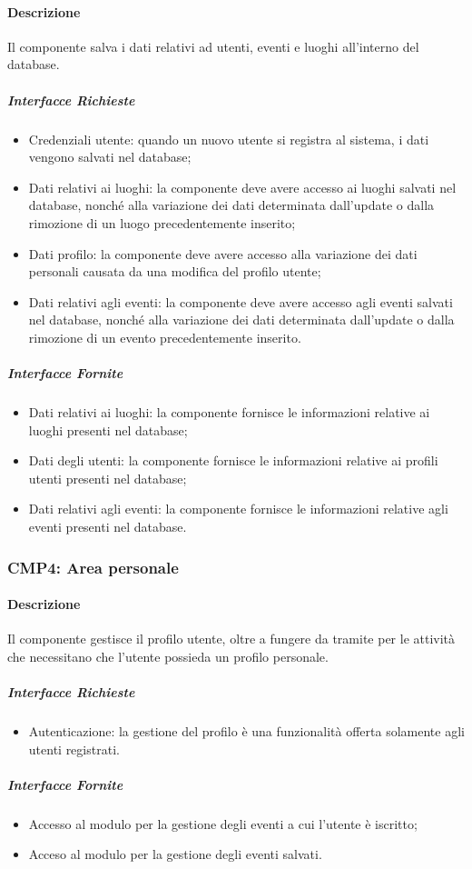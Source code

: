 \documentclass[9pt]{extarticle}
\begin{document}
\paragraph{Descrizione}
Il componente salva i dati relativi ad utenti, eventi e luoghi all'interno del database.
\subparagraph{Interfacce Richieste}
\begin{itemize}
	\item Credenziali utente: quando un nuovo utente si registra al sistema, i dati vengono salvati nel database;
	\item Dati relativi ai luoghi: la componente deve avere accesso ai luoghi salvati nel database, nonché alla variazione dei dati determinata dall'update o dalla rimozione di un luogo precedentemente inserito;
	\item Dati profilo: la componente deve avere accesso alla variazione dei dati personali causata da una modifica del profilo utente;
	\item Dati relativi agli eventi: la componente deve avere accesso agli eventi salvati nel database, nonché  alla variazione dei dati determinata dall'update o dalla rimozione di un evento precedentemente inserito.
\end{itemize}
\subparagraph{Interfacce Fornite}
\begin{itemize}
	\item Dati relativi ai luoghi: la componente fornisce le informazioni relative ai luoghi presenti nel database;
	\item Dati degli utenti: la componente fornisce le informazioni relative ai profili utenti presenti nel database;
	\item Dati relativi agli eventi: la componente fornisce le informazioni relative agli eventi presenti nel database.
\end{itemize}



\subsubsection*{CMP4: Area personale}
\paragraph{Descrizione}
Il componente gestisce il profilo utente, oltre a fungere da tramite per le attività che necessitano che l'utente possieda un profilo personale.

\subparagraph{Interfacce Richieste}
\begin{itemize}
	\item Autenticazione: la gestione del profilo è una funzionalità offerta solamente agli utenti registrati.
\end{itemize}
\subparagraph{Interfacce Fornite}
\begin{itemize}
	\item Accesso al modulo per la gestione degli eventi a cui l'utente è iscritto;
	\item Acceso al modulo per la gestione degli eventi salvati.
\end{itemize}
\end{document}
